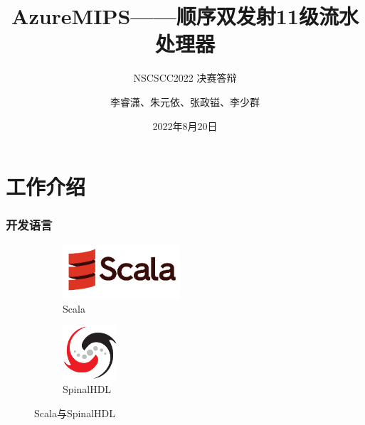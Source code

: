 \documentclass{beamer}
\author{李睿潇、朱元依、张政镒、李少群}
\title{AzureMIPS——顺序双发射11级流水处理器}
\subtitle{NSCSCC2022 决赛答辩}
\institute{复旦大学}
\date{2022年8月20日}
\begin{document}
    
\begin{frame}
    \titlepage
\end{frame}

\begin{frame}
    \tableofcontents[sectionstyle=show,subsectionstyle=show/shaded/hide,subsubsectionstyle=show/shaded/hide]
\end{frame}

\section{工作介绍}

\begin{frame}
    \frametitle{开发语言}




    \begin{figure}
        \centering
        \begin{subfigure}{.4\textwidth}
            \centering
            \includegraphics[height=2cm]{pic/Scala-full-color.pdf}
            \caption{Scala}
        \end{subfigure}
        \begin{subfigure}{.4\textwidth}
            \centering
            \includegraphics[height=2cm]{pic/SpinalHDL.png}
            \caption{SpinalHDL}
        \end{subfigure}
        \caption{Scala与SpinalHDL}
    \end{figure}


\end{frame}
\end{document}
